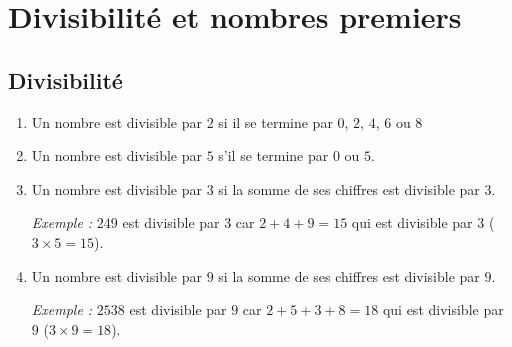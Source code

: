 \documentclass[a4paper,10pt]{report}
\begin{document}
\newpage
\setcounter{chapter}{15}
\chapter{Divisibilité et nombres premiers}

\section{Divisibilité}

\vspace{-2mm}





\begin{meth}
\begin{enumerate}
\item[•] Un nombre est divisible par $2$ si il se termine par $0$, $2$, $4$, $6$ ou $8$
\item[•] Un nombre est divisible par $5$ s'il se termine par $0$ ou $5$.

\item[•] Un nombre est divisible par $3$ si la somme de ses chiffres est divisible par $3$.

\medskip
\textit{Exemple :} $249$ est divisible par $3$ car $2 + 4 + 9 = 15$ qui est divisible par $3$ ($3 \times 5 = 15$).

\item[•] Un nombre est divisible par $9$ si la somme de ses chiffres est divisible par $9$.

\medskip
\textit{Exemple :} $2 538$ est divisible par $9$ car $2 + 5 + 3 + 8 = 18$ qui est divisible par $9$ ($3 \times 9 = 18$).
\end{enumerate}
\end{meth}
\end{document}

